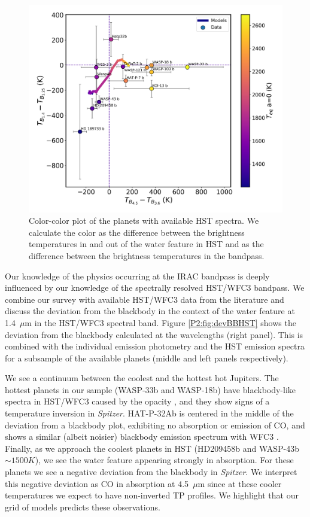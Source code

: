 \begin{figure}
    \centering
    \includegraphics[trim={0.5cm 0.5cm 0.5cm 0.5cm},clip,width=\linewidth]{Tb14-Tb125vsTb45-Tb36.pdf}
    \caption{Color-color plot of the planets with available HST spectra. We calculate the color as the difference between the brightness temperatures in and out of the water feature in HST and as the difference between the brightness temperatures in the \spitzer bandpass.}
    \label{P2:fig:TbHST}
\end{figure}

Our knowledge of the physics occurring at the IRAC bandpass is deeply influenced by our knowledge of the spectrally resolved HST/WFC3 bandpass. We combine our \spitzer survey with available HST/WFC3 data from the literature and discuss the deviation from the blackbody in the context of the water feature at 1.4~$\mu$m in the HST/WFC3 spectral band. Figure \ref{P2:fig:devBBHST} shows the deviation from the blackbody calculated at the \spitzer wavelengths (right panel). This is combined with the individual \spitzer emission photometry and the HST emission spectra for a subsample of the available planets (middle and left panels respectively).

We see a continuum between the coolest and the hottest hot Jupiters. The hottest planets in our sample (WASP-33b and WASP-18b) have blackbody-like  spectra in HST/WFC3 caused by the  opacity \citep{Arcangeli2018}, and they show signs of a temperature inversion in \textit{Spitzer}. HAT-P-32Ab is centered in the middle of the deviation from a blackbody plot, exhibiting no absorption or emission of CO, and shows a similar (albeit  noisier) blackbody emission spectrum with WFC3 \citep{Nikolov2018}. Finally, as we approach the coolest planets in HST (HD209458b and WASP-43b $\sim1500K$), we see the water feature appearing strongly in absorption. For these planets we see a negative deviation from the blackbody in \textit{Spitzer}. We interpret this negative deviation as CO in absorption at 4.5~$\mu$m since at these cooler temperatures we expect to have non-inverted TP profiles. We highlight that our grid of models predicts these observations.

